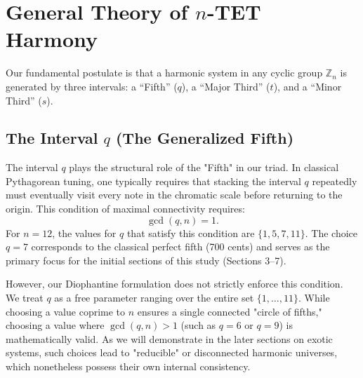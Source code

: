 \documentclass[12pt,letterpaper]{amsart}
\begin{document}
\section{General Theory of $n$-TET Harmony}

Our fundamental postulate is that a harmonic system in any cyclic group $\mathbb{Z}_n$ is generated by three intervals: a ``Fifth'' ($q$), a ``Major Third'' ($t$), and a ``Minor Third'' ($s$).

\subsection{The Interval $q$ (The Generalized Fifth)} The interval $q$ plays the structural role of the "Fifth" in our triad. In classical Pythagorean tuning, one typically requires that stacking the interval $q$ repeatedly must eventually visit every note in the chromatic scale before returning to the origin. This condition of maximal connectivity requires:
\begin{equation}
\label{eq:gcd}
\gcd(q, n) = 1.
\end{equation}
For $n = 12$, the values for $q$ that satisfy this condition are $\{1, 5, 7, 11\}$. The choice $q = 7$ corresponds to the classical perfect fifth (700 cents) and serves as the primary focus for the initial sections of this study (Sections 3--7).

However, our Diophantine formulation does not strictly enforce this condition. We treat $q$ as a free parameter ranging over the entire set $\{1, \dots, 11\}$. While choosing a value coprime to $n$ ensures a single connected "circle of fifths," choosing a value where $\gcd(q, n) > 1$ (such as $q=6$ or $q=9$) is mathematically valid. As we will demonstrate in the later sections on exotic systems, such choices lead to "reducible" or disconnected harmonic universes, which nonetheless possess their own internal consistency.



\end{document}
